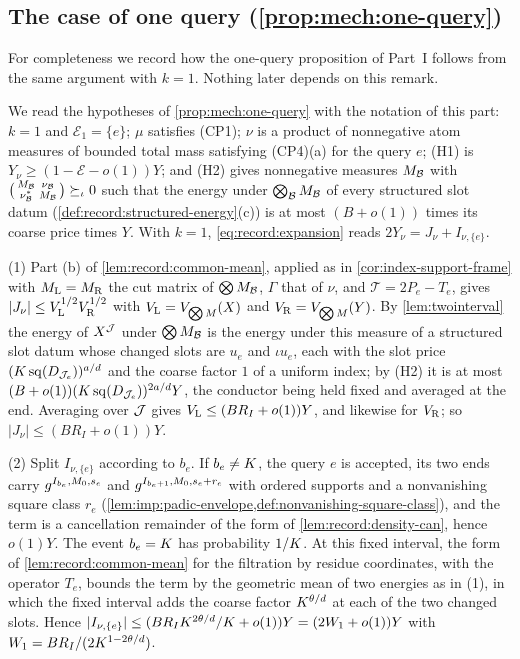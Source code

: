 \subsection{The case of one query (\texorpdfstring{\cref{prop:mech:one-query}}{Proposition \ref*{prop:mech:one-query}})}\label{subsec:cp:one-query}

For completeness we record how the one-query proposition of
Part~I follows from the same argument with $k=1$. Nothing later
depends on this remark.

\begin{remark}\label{rem:cp:one-query}
We read the hypotheses of \cref{prop:mech:one-query} with the notation of this part: $k=1$ and $\mathcal E_1=\{e\}$; $\mu$ satisfies (CP1); $\nu$ is a
product of nonnegative atom measures of bounded total mass satisfying
(CP4)(a) for the query $e$; (H1) is
$Y_\nu\ge(1-\mathcal E-o(1))Y$; and (H2) gives nonnegative measures
$M_{\mathcal B}$ with $\bigl(\begin{smallmatrix}M_{\mathcal B}&\nu_{\mathcal B}\\
\nu_{\mathcal B}^*&M_{\mathcal B}\end{smallmatrix}\bigr)\succeq_\iota0$ such that the
energy under $\bigotimes_{\mathcal B}M_{\mathcal B}$ of every structured slot datum
(\cref{def:record:structured-energy}(c)) is at most $(B+o(1))$ times its
coarse price times $Y$. With $k=1$, \eqref{eq:record:expansion} reads
$2Y_\nu=J_\nu+I_{\nu,\{e\}}$.

(1) Part (b) of \cref{lem:record:common-mean}, applied as in
\cref{cor:index-support-frame} with $M_{\rm L}=M_{\rm R}$ the cut matrix of
$\bigotimes M_{\mathcal B}$, $\Gamma$ that of $\nu$, and $\mathcal T=2P_e-T_e$, gives
$|J_\nu|\le V_{\rm L}^{1/2}V_{\rm R}^{1/2}$ with $V_{\rm L}=V_{\bigotimes M}(X)$ and
$V_{\rm R}=V_{\bigotimes M}(Y)$. By \cref{lem:twointerval} the energy of
$X^{\mathcal J}$ under $\bigotimes M_{\mathcal B}$ is the energy under this measure of a
structured slot datum whose changed slots are $u_e$ and $\iota u_e$, each
with the slot price
$(K\operatorname{sq}(D_{\mathcal J_e}))^{a/d}$ and the coarse factor $1$ of a uniform index; by
(H2) it is at most $(B+o(1))(K\operatorname{sq}(D_{\mathcal J_e}))^{2a/d}Y$, the conductor
being held fixed and averaged at the end. Averaging over $\mathcal J$ gives $V_{\rm
L}\le(BR_I+o(1))Y$, and likewise for $V_{\rm R}$; so $|J_\nu|\le(BR_I+o(1))Y$.

(2) Split $I_{\nu,\{e\}}$ according to $b_e$. If $b_e\ne K$, the query $e$
is accepted, its two ends carry $g^{I_{b_e},M_0,s_e}$ and
$g^{I_{b_e+1},M_0,s_e+r_e}$ with ordered supports and a nonvanishing square class
$r_e$ (\cref{lem:imp:padic-envelope,def:nonvanishing-square-class}), and the term is a cancellation remainder of
the form of \cref{lem:record:density-can}, hence $o(1)Y$. The event
$b_e=K$ has probability $1/K$. At this fixed interval,
the form of \cref{lem:record:common-mean} for the filtration by
residue coordinates, with the operator
$T_e$, bounds the term by the geometric mean of two energies as in (1), in
which the fixed interval adds the coarse factor $K^{\theta/d}$ at each of
the two changed slots. Hence $|I_{\nu,\{e\}}|\le(BR_IK^{2\theta/d}/K
+o(1))Y=(2W_1+o(1))Y$ with $W_1=BR_I/(2K^{1-2\theta/d})$.


\end{remark}
